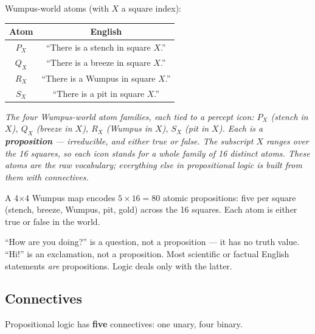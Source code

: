 \documentclass[11pt, a4paper]{article}
\newcommand{\thead}[1]{\textbf{#1}}
\begin{document}
Wumpus-world atoms (with $X$ a square index):

\begin{center}
\begin{tabular}{@{}cc@{}}
\toprule
\thead{Atom} & \thead{English} \\
\midrule
$P_X$ & ``There is a stench in square $X$.'' \\
$Q_X$ & ``There is a breeze in square $X$.'' \\
$R_X$ & ``There is a Wumpus in square $X$.'' \\
$S_X$ & ``There is a pit in square $X$.'' \\
\bottomrule
\end{tabular}
\end{center}

\begin{center}

\footnotesize\textit{The four Wumpus-world atom families, each tied to a percept icon: $P_X$ (stench in $X$), $Q_X$ (breeze in $X$), $R_X$ (Wumpus in $X$), $S_X$ (pit in $X$). Each is a \textbf{proposition} — irreducible, and either true or false. The subscript $X$ ranges over the 16 squares, so each icon stands for a whole family of 16 distinct atoms. These atoms are the raw vocabulary; everything else in propositional logic is built from them with connectives.}
\end{center}

A 4$\times$4 Wumpus map encodes $5 \times 16 = 80$ atomic propositions: five per square (stench, breeze, Wumpus, pit, gold) across the 16 squares. Each atom is either true or false in the world.

\begin{notebox}
``How are you doing?'' is a question, not a proposition — it has no truth value. ``Hi!'' is an exclamation, not a proposition. Most scientific or factual English statements \emph{are} propositions. Logic deals only with the latter.
\end{notebox}

\subsection{Connectives}

Propositional logic has \textbf{five} connectives: one unary, four binary.
\end{document}
